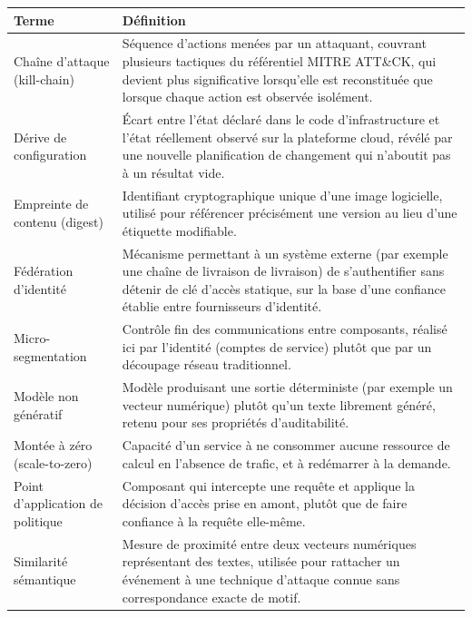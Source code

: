 \begin{longtable}{|P{4cm}|P{10.5cm}|}
\hline
\textbf{Terme} & \textbf{Définition} \\
\hline
\endhead
Chaîne d'attaque (kill-chain) & Séquence d'actions menées par un attaquant, couvrant
plusieurs tactiques du référentiel MITRE ATT\&CK, qui devient plus significative lorsqu'elle
est reconstituée que lorsque chaque action est observée isolément. \\ \hline
Dérive de configuration & Écart entre l'état déclaré dans le code d'infrastructure et
l'état réellement observé sur la plateforme cloud, révélé par une nouvelle planification de
changement qui n'aboutit pas à un résultat vide. \\ \hline
Empreinte de contenu (digest) & Identifiant cryptographique unique d'une image logicielle,
utilisé pour référencer précisément une version au lieu d'une étiquette modifiable. \\ \hline
Fédération d'identité & Mécanisme permettant à un système externe (par exemple une chaîne de livraison
de livraison) de s'authentifier sans détenir de clé d'accès statique, sur la base d'une
confiance établie entre fournisseurs d'identité. \\ \hline
Micro-segmentation & Contrôle fin des communications entre composants, réalisé ici par
l'identité (comptes de service) plutôt que par un découpage réseau traditionnel. \\ \hline
Modèle non génératif & Modèle produisant une sortie déterministe (par exemple un vecteur
numérique) plutôt qu'un texte librement généré, retenu pour ses propriétés d'auditabilité. \\ \hline
Montée à zéro (scale-to-zero) & Capacité d'un service à ne consommer aucune ressource de
calcul en l'absence de trafic, et à redémarrer à la demande. \\ \hline
Point d'application de politique & Composant qui intercepte une requête et applique la
décision d'accès prise en amont, plutôt que de faire confiance à la requête elle-même. \\ \hline
Similarité sémantique & Mesure de proximité entre deux vecteurs numériques représentant des
textes, utilisée pour rattacher un événement à une technique d'attaque connue sans
correspondance exacte de motif. \\
\hline
\end{longtable}
\addtocounter{table}{-1}
